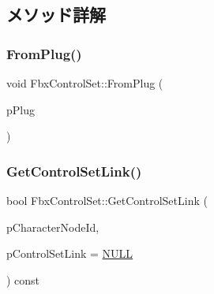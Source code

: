 \subsection{メソッド詳解}
\mbox{\label{class_fbx_control_set_a75413f090af90a642bb5fc7434ac805b}} 
\subsubsection{\texorpdfstring{From\+Plug()}{FromPlug()}}
{\footnotesize\ttfamily void Fbx\+Control\+Set\+::\+From\+Plug (\begin{DoxyParamCaption}\item[{\hyperlink{class_fbx_control_set_plug}{Fbx\+Control\+Set\+Plug} $\ast$}]{p\+Plug }\end{DoxyParamCaption})}

\mbox{\label{class_fbx_control_set_aec762ddd33c928ef92493332ad5adcc8}} 
\subsubsection{\texorpdfstring{Get\+Control\+Set\+Link()}{GetControlSetLink()}}
{\footnotesize\ttfamily bool Fbx\+Control\+Set\+::\+Get\+Control\+Set\+Link (\begin{DoxyParamCaption}\item[{\hyperlink{class_fbx_character_ad75bf42026e435ac0ff4d7ece2317be4}{Fbx\+Character\+::\+E\+Node\+Id}}]{p\+Character\+Node\+Id,  }\item[{\hyperlink{class_fbx_control_set_link}{Fbx\+Control\+Set\+Link} $\ast$}]{p\+Control\+Set\+Link = {\ttfamily \hyperlink{fbxarch_8h_a070d2ce7b6bb7e5c05602aa8c308d0c4}{N\+U\+LL}} }\end{DoxyParamCaption}) const}


